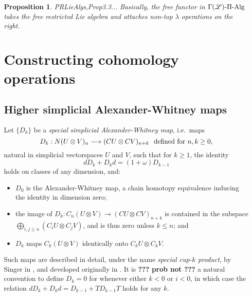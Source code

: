 \documentclass[11pt]{amsart}
\theoremstyle{plain}
\newtheorem{prop}[thm]{Proposition}
\theoremstyle{definition}
\renewcommand{\to}{\longrightarrow}
\newcommand{\scrL}{\mathscr{L}}
\theoremstyle{plain}
\newcommand{\LieOperad}{{\scrL}}
\newcommand{\PiAlg}{\textup{-$\Pi$-Alg}}
\newcommand{\twist}{\omega}
\begin{document}
\begin{Constructing homotopy and cohomotopy operations}
\begin{prop}
{\textup{PRLieAlgs,Prop3.3}}... Basically, the free functor in $\Gamma(\LieOperad)\PiAlg$ takes the free restricted Lie algebra and attaches non-top $\lambda$ operations on the right.
\end{prop}

\section{\textbf{Constructing cohomology operations}}\label{sec:Constructing cohomology operations}

\subsection{Higher simplicial Alexander-Whitney maps}
Let $\{D_k\}$ be a \emph{special simplicial Alexander-Whitney map},  i.e.\  maps
\[D_k:N(U\otimes V)_{n}\to (CU\otimes CV)_{n+k}\textup{\ \ defined for $n,k\geq0$},\]
natural in simplicial vectorspaces $U$ and $V$, such that for $k\geq1$, the identity
\[dD_k+D_kd=(1+\twist) D_{k-1}
\]
holds on classes of any dimension, and:
\begin{itemize}
\setlength{\parindent}{.25in}
\item $D_0$ is the Alexander-Whitney map, a chain homotopy equivalence inducing the identity in dimension zero;
\item the image  of $D_k:C_n(U\otimes V)\to (CU\otimes CV)_{n+k}$ is contained in the subspace
$\textstyle\bigoplus_{i,j\leq n}(C_iU\otimes C_jV)$, and is thus zero unless $k\leq n$; and
\item $D_k$ maps $C_{k}(U\otimes V)$ identically onto $C_{k}U\otimes C_{k}V$.
\end{itemize}
Such maps are described in detail, under the name \emph{special cup-$k$ product}, by Singer in \cite[Definitions 1.91 and 1.94]{MR2245560}, and developed originally in \cite{DoldUber}.
It is \textbf{??? prob not ???} a natural convention to define $D_k=0$ for whenever either $k<0$ or $i<0$, in which case the relation $dD_k+D_kd=D_{k-1}+TD_{k-1}T$ holds for any $k$.


\end{Constructing homotopy and cohomotopy operations}
\end{document}
